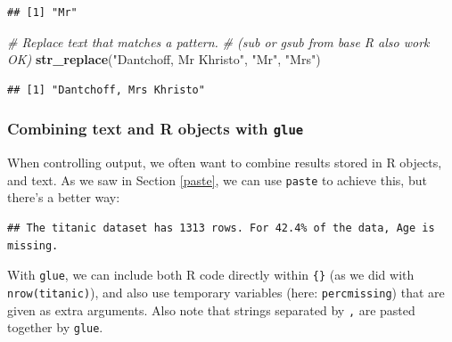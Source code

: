 \documentclass[]{book}
\newenvironment{Shaded}{\begin{snugshade}}{\end{snugshade}}
\newcommand{\CommentTok}[1]{\textcolor[rgb]{0.56,0.35,0.01}{\textit{#1}}}
\newcommand{\DataTypeTok}[1]{\textcolor[rgb]{0.13,0.29,0.53}{#1}}
\newcommand{\DecValTok}[1]{\textcolor[rgb]{0.00,0.00,0.81}{#1}}
\newcommand{\KeywordTok}[1]{\textcolor[rgb]{0.13,0.29,0.53}{\textbf{#1}}}
\newcommand{\NormalTok}[1]{#1}
\newcommand{\OperatorTok}[1]{\textcolor[rgb]{0.81,0.36,0.00}{\textbf{#1}}}
\newcommand{\StringTok}[1]{\textcolor[rgb]{0.31,0.60,0.02}{#1}}
\begin{document}
\begin{verbatim}
## [1] "Mr"
\end{verbatim}

\begin{Shaded}
\begin{Highlighting}[]
\CommentTok{# Replace text that matches a pattern.}
\CommentTok{# (sub or gsub from base R also work OK)}
\KeywordTok{str_replace}\NormalTok{(}\StringTok{"Dantchoff, Mr Khristo"}\NormalTok{, }\StringTok{"Mr"}\NormalTok{, }\StringTok{"Mrs"}\NormalTok{)}
\end{Highlighting}
\end{Shaded}

\begin{verbatim}
## [1] "Dantchoff, Mrs Khristo"
\end{verbatim}

\hypertarget{combining-text-and-r-objects-with-glue}{%
\subsubsection{\texorpdfstring{Combining text and R objects with \texttt{glue}}{Combining text and R objects with glue}}\label{combining-text-and-r-objects-with-glue}}

When controlling output, we often want to combine results stored in R objects, and text. As we saw in Section \ref{paste}, we can use \texttt{paste} to achieve this, but there's a better way:

\begin{Shaded}
\end{Shaded}

\begin{verbatim}
## The titanic dataset has 1313 rows. For 42.4% of the data, Age is missing.
\end{verbatim}

With \texttt{glue}, we can include both R code directly within \texttt{\{\}} (as we did with \texttt{nrow(titanic)}), and also use temporary variables (here: \texttt{percmissing}) that are given as extra arguments. Also note that strings separated by \texttt{,} are pasted together by \texttt{glue}.
\end{document}
